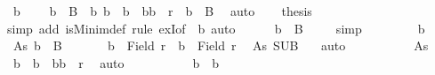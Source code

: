 \begin{isabellebody}
\ b\ \isanewline
\ \ {\isacharasterisk}{\kern0pt}{\isacharcolon}{\kern0pt}\ {\isachardoublequoteopen}b\ {\isasymin}\ B\ {\isasymand}\ {\isacharparenleft}{\kern0pt}{\isasymforall}b{\isacharprime}{\kern0pt}{\isachardot}{\kern0pt}\ b{\isacharprime}{\kern0pt}\ {\isasymnoteq}\ b\ {\isasymand}\ {\isacharparenleft}{\kern0pt}b{\isacharprime}{\kern0pt}{\isacharcomma}{\kern0pt}b{\isacharparenright}{\kern0pt}\ {\isasymin}\ r\ {\isasymlongrightarrow}\ b{\isacharprime}{\kern0pt}\ {\isasymnotin}\ B{\isacharparenright}{\kern0pt}{\isachardoublequoteclose}\ \isamarkupfalse%
\ auto\isanewline
\ \ \isamarkupfalse%
\ {\isacharquery}{\kern0pt}thesis\isanewline
\ \ \isamarkupfalse%
{\isacharparenleft}{\kern0pt}simp\ add{\isacharcolon}{\kern0pt}\ isMinim{\isacharunderscore}{\kern0pt}def{\isacharcomma}{\kern0pt}\ rule\ exI{\isacharbrackleft}{\kern0pt}of\ {\isacharunderscore}{\kern0pt}\ b{\isacharbrackright}{\kern0pt}{\isacharcomma}{\kern0pt}\ auto{\isacharparenright}{\kern0pt}\isanewline
\ \ \ \ \isamarkupfalse%
\ {\isachardoublequoteopen}b\ {\isasymin}\ B{\isachardoublequoteclose}\ \isamarkupfalse%
\ {\isacharasterisk}{\kern0pt}\ \isamarkupfalse%
\ simp\isanewline
\ \ \isamarkupfalse%
\isanewline
\ \ \ \ \isamarkupfalse%
\ b{\isacharprime}{\kern0pt}\ \isamarkupfalse%
\ As{\isacharcolon}{\kern0pt}\ {\isachardoublequoteopen}b{\isacharprime}{\kern0pt}\ {\isasymin}\ B{\isachardoublequoteclose}\isanewline
\ \ \ \ \isamarkupfalse%
\ {\isacharasterisk}{\kern0pt}{\isacharasterisk}{\kern0pt}{\isacharcolon}{\kern0pt}\ {\isachardoublequoteopen}b\ {\isasymin}\ Field\ r\ {\isasymand}\ b{\isacharprime}{\kern0pt}\ {\isasymin}\ Field\ r{\isachardoublequoteclose}\ \isamarkupfalse%
\ As\ SUB\ {\isacharasterisk}{\kern0pt}\ \isamarkupfalse%
\ auto\isanewline
\ \ \ \ \isanewline
\ \ \ \ \isamarkupfalse%
\ As\ \ {\isacharasterisk}{\kern0pt}\ \isamarkupfalse%
\ {\isachardoublequoteopen}b{\isacharprime}{\kern0pt}\ {\isacharequal}{\kern0pt}\ b\ {\isasymor}\ {\isacharparenleft}{\kern0pt}b{\isacharprime}{\kern0pt}{\isacharcomma}{\kern0pt}b{\isacharparenright}{\kern0pt}\ {\isasymnotin}\ r{\isachardoublequoteclose}\ \isamarkupfalse%
\ auto\isanewline
\ \ \ \ \isamarkupfalse%
\isanewline
\ \ \ \ \isacommand{{\isacharbraceleft}{\kern0pt}}\isamarkupfalse%
\isamarkupfalse%
\ {\isachardoublequoteopen}b{\isacharprime}{\kern0pt}\ {\isacharequal}{\kern0pt}\ b{\isachardoublequoteclose}\isanewline

\end{isabellebody}
